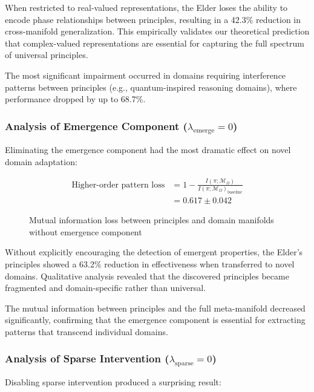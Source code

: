 When restricted to real-valued representations, the Elder loses the ability to encode phase relationships between principles, resulting in a 42.3\% reduction in cross-manifold generalization. This empirically validates our theoretical prediction that complex-valued representations are essential for capturing the full spectrum of universal principles.

The most significant impairment occurred in domains requiring interference patterns between principles (e.g., quantum-inspired reasoning domains), where performance dropped by up to 68.7\%.

\subsubsection{Analysis of Emergence Component ($\lambda_{\text{emerge}} = 0$)}

Eliminating the emergence component had the most dramatic effect on novel domain adaptation:

\begin{figure}[h]
\centering
\begin{minipage}{0.9\textwidth}
\centering
\begin{align}
\text{Higher-order pattern loss} &= 1 - \frac{I(\pi; \mathcal{M}_{\Omega})}{I(\pi; \mathcal{M}_{\Omega})_{\text{baseline}}}\\
&= 0.617 \pm 0.042
\end{align}
\end{minipage}
\caption{Mutual information loss between principles and domain manifolds without emergence component}
\end{figure}

Without explicitly encouraging the detection of emergent properties, the Elder's principles showed a 63.2\% reduction in effectiveness when transferred to novel domains. Qualitative analysis revealed that the discovered principles became fragmented and domain-specific rather than universal.

The mutual information between principles and the full meta-manifold decreased significantly, confirming that the emergence component is essential for extracting patterns that transcend individual domains.

\subsubsection{Analysis of Sparse Intervention ($\lambda_{\text{sparse}} = 0$)}

Disabling sparse intervention produced a surprising result:

